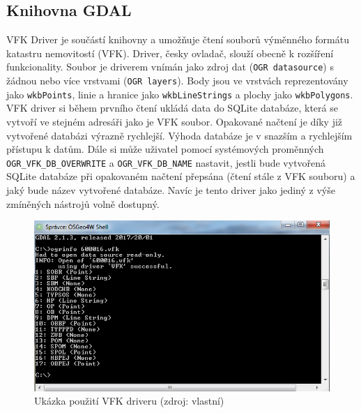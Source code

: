 \subsection{Knihovna GDAL}
\label{subsec:gdal_vfk}
VFK Driver je součástí knihovny  a umožňuje čtení souborů
výměnného formátu katastru nemovitostí (VFK). Driver, česky ovladač,
slouží obecně k rozšíření funkcionality. Soubor  je driverem
vnímán jako zdroj dat (\verb|OGR datasource|) s žádnou nebo více
vrstvami (\verb|OGR layers|). Body jsou ve vrstvách reprezentovány
jako \verb|wkbPoints|, linie a hranice jako \verb|wkbLineStrings| a
plochy jako \verb|wkbPolygons|. VFK driver si během prvního čtení
ukládá data do SQLite databáze, která se vytvoří ve stejném adresáři
jako je VFK soubor. Opakované načtení je díky již vytvořené databázi
výrazně rychlejší. Výhoda databáze je v snazším a rychlejším přístupu
k datům. Dále si může uživatel pomocí systémových proměnných
\verb|OGR_VFK_DB_OVERWRITE| a \verb|OGR_VFK_DB_NAME| nastavit, jestli
bude vytvořená SQLite databáze při opakovaném načtení přepsána (čtení
stále z VFK souboru) a jaký bude název vytvořené databáze. Navíc je
tento driver jako jediný z výše zmíněných nástrojů volně
dostupný. \cite{vfk_driver}

\begin{figure}[H]
	 \centering
      \includegraphics[width=15cm]{./pictures/vfk_driver.png}
      \caption{Ukázka použití VFK driveru (zdroj: vlastní)}
      \label{fig:vfk_driver}
  \end{figure}
